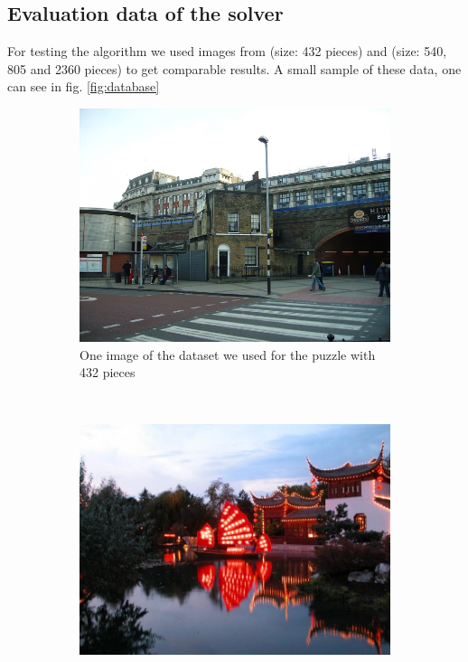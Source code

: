 \documentclass[11pt]{report}
\begin{document}
\subsection{Evaluation data of the solver}
For testing the algorithm we used images from \cite{Cho2010} (size: 432 pieces) and \cite{Pomeranz2011} (size: 540, 805 and 2360 pieces) to get comparable results. A small sample of these data, one can see in fig. \ref{fig:database}

\begin{figure}
	\centering
	\begin{subfigure}[b]{0.45\textwidth}
		\includegraphics[width=\textwidth]{../imData/432/1.png}
		\caption{One image of the dataset we used for the puzzle with 432 pieces}
		\label{img:432}
	\end{subfigure}
	~
	\begin{subfigure}[b]{0.45\textwidth}
		\includegraphics[width=\textwidth]{../imData/540/1.jpg}

\end{subfigure}
\end{figure}
\end{document}
